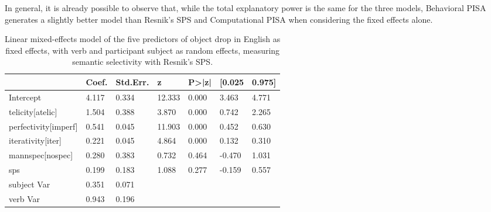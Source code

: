 In general, it is already possible to observe that, while the total explanatory power is the same for the three models, Behavioral PISA generates a slightly better model than Resnik's SPS and Computational PISA when considering the fixed effects alone.

\begin{table}[htb] %
\caption{Linear mixed-effects model of the five predictors of object drop in English as fixed effects, with verb and participant subject as random effects, measuring semantic selectivity with Resnik's SPS.}
\begin{tabular}{l|llllll}
                         & Coef. & Std.Err. & z      & P\textgreater{}|z| & {[}0.025 & 0.975{]} \\
\hline                         
Intercept                & 4.117 & 0.334    & 12.333 & 0.000                  & 3.463    & 4.771    \\
telicity{[}atelic{]}     & 1.504 & 0.388    & 3.870   & 0.000                  & 0.742    & 2.265    \\
perfectivity{[}imperf{]} & 0.541 & 0.045    & 11.903 & 0.000                  & 0.452    & 0.630     \\
iterativity{[}iter{]}    & 0.221 & 0.045    & 4.864  & 0.000                  & 0.132    & 0.310     \\
mannspec{[}nospec{]}     & 0.280  & 0.383    & 0.732  & 0.464              & -0.470    & 1.031    \\
sps                      & 0.199 & 0.183    & 1.088  & 0.277              & -0.159   & 0.557    \\
subject                 Var   & 0.351    & 0.071  &                    &          &       &     \\
verb                 Var   & 0.943    & 0.196  &                    &          &         &     
\end{tabular}
\end{table}

